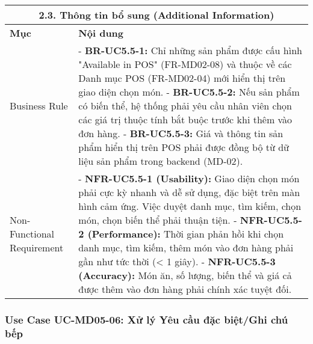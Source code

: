 \begin{longtable}{|m{4cm}|p{11cm}|}
\hline
\multicolumn{2}{|c|}{\textbf{2.3. Thông tin bổ sung (Additional Information)}} \\
\hline
\textbf{Mục} & \textbf{Nội dung} \\
\hline
Business Rule & - \textbf{BR-UC5.5-1:} Chỉ những sản phẩm được cấu hình "Available in POS" (FR-MD02-08) và thuộc về các Danh mục POS (FR-MD02-04) mới hiển thị trên giao diện chọn món. \newline - \textbf{BR-UC5.5-2:} Nếu sản phẩm có biến thể, hệ thống phải yêu cầu nhân viên chọn các giá trị thuộc tính bắt buộc trước khi thêm vào đơn hàng. \newline - \textbf{BR-UC5.5-3:} Giá và thông tin sản phẩm hiển thị trên POS phải được đồng bộ từ dữ liệu sản phẩm trong backend (MD-02). \\
\hline
Non-Functional Requirement & - \textbf{NFR-UC5.5-1 (Usability):} Giao diện chọn món phải cực kỳ nhanh và dễ sử dụng, đặc biệt trên màn hình cảm ứng. Việc duyệt danh mục, tìm kiếm, chọn món, chọn biến thể phải thuận tiện. \newline - \textbf{NFR-UC5.5-2 (Performance):} Thời gian phản hồi khi chọn danh mục, tìm kiếm, thêm món vào đơn hàng phải gần như tức thời (< 1 giây). \newline - \textbf{NFR-UC5.5-3 (Accuracy):} Món ăn, số lượng, biến thể và giá cả được thêm vào đơn hàng phải chính xác tuyệt đối. \\
\hline
\end{longtable}


\subsubsection{Use Case UC-MD05-06: Xử lý Yêu cầu đặc biệt/Ghi chú bếp}

